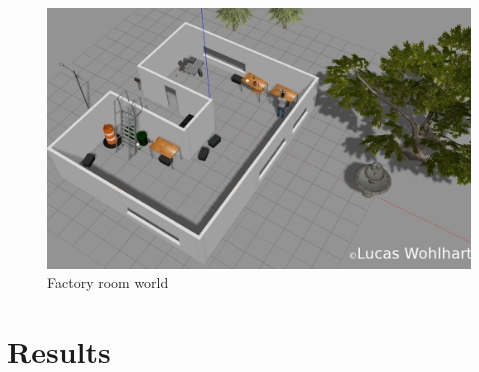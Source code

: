 \documentclass[10pt,journal,compsoc]{IEEEtran}
\begin{document}
\begin{figure}[thpb]
      \centering
      \includegraphics[width=\linewidth]{img/factory_world.png}
      \caption{Factory room world}
      \label{fig:factory_world}
\end{figure}



\section{Results}

\end{document}

